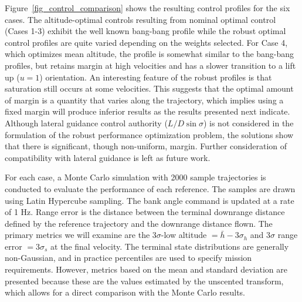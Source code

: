 \documentclass[journal ]{new-aiaa}
\begin{document}
Figure~\ref{fig_control_comparison} shows the resulting control profiles for the six cases. The altitude-optimal controls resulting from nominal optimal control (Cases 1-3) exhibit the well known bang-bang profile while the robust optimal control profiles are quite varied depending on the weights selected. For Case 4, which optimizes mean altitude, the profile is somewhat similar to the bang-bang profiles, but retains margin at high velocities and has a slower transition to a lift up ($u=1$) orientation. An interesting feature of the robust profiles is that saturation still occurs at some velocities. This suggests that the optimal amount of margin is a quantity that varies along the trajectory, which implies using a fixed margin will produce inferior results as the results presented next indicate. Although lateral guidance control authority ($L/D \sin\sigma$) is not considered in the formulation of the robust performance optimization problem, the solutions show that there is significant, though non-uniform, margin. Further consideration of compatibility with lateral guidance is left as future work. %

For each case, a Monte Carlo simulation with 2000 sample trajectories is conducted to evaluate the performance of each reference. The samples are drawn using Latin Hypercube sampling. The bank angle command is updated at a rate of 1 Hz. Range error is the distance between the terminal downrange distance defined by the reference trajectory and the downrange distance flown. The primary metrics we will examine are the 3$\sigma$-low altitude $=\bar{h}-3\sigma_h$ and 3$\sigma$ range error $= 3\sigma_s$ at the final velocity. The terminal state distributions are generally non-Gaussian, and in practice percentiles are used to specify mission requirements. However, metrics based on the mean and standard deviation are presented because these are the values estimated by the unscented transform, which allows for a direct comparison with the Monte Carlo results.
\end{document}
